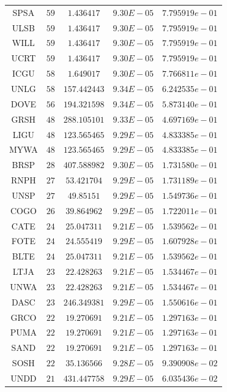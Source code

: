\documentclass{statsoc}
\begin{document}
\begin{table}
{\begin{tabular}{*{5}{c}}
SPSA  &  $59$  &  $1.436417$  &  $9.30E-05$  &  $7.795919e-01$\\
ULSB  &  $59$  &  $1.436417$  &  $9.30E-05$  &  $7.795919e-01$\\
WILL  &  $59$  &  $1.436417$  &  $9.30E-05$  &  $7.795919e-01$\\
UCRT  &  $59$  &  $1.436417$  &  $9.30E-05$  &  $7.795919e-01$\\
ICGU  &  $58$  &  $1.649017$  &  $9.30E-05$  &  $7.766811e-01$\\
UNLG  &  $58$  &  $157.442443$  &  $9.34E-05$  &  $6.242535e-01$\\
DOVE  &  $56$  &  $194.321598$  &  $9.34E-05$  &  $5.873140e-01$\\
GRSH  &  $48$  &  $288.105101$  &  $9.33E-05$  &  $4.697169e-01$\\
LIGU  &  $48$  &  $123.565465$  &  $9.29E-05$  &  $4.833385e-01$\\
MYWA  &  $48$  &  $123.565465$  &  $9.29E-05$  &  $4.833385e-01$\\
BRSP  &  $28$  &  $407.588982$  &  $9.30E-05$  &  $1.731580e-01$\\
RNPH  &  $27$  &  $53.421704$  &  $9.29E-05$  &  $1.731189e-01$\\
UNSP  &  $27$  &  $49.85151$  &  $9.29E-05$  &  $1.549736e-01$\\
COGO  &  $26$  &  $39.864962$  &  $9.29E-05$  &  $1.722011e-01$\\
CATE  &  $24$  &  $25.047311$  &  $9.21E-05$  &  $1.539562e-01$\\
FOTE  &  $24$  &  $24.555419$  &  $9.29E-05$  &  $1.607928e-01$\\
BLTE  &  $24$  &  $25.047311$  &  $9.21E-05$  &  $1.539562e-01$\\
LTJA  &  $23$  &  $22.428263$  &  $9.21E-05$  &  $1.534467e-01$\\
UNWA  &  $23$  &  $22.428263$  &  $9.21E-05$  &  $1.534467e-01$\\
DASC  &  $23$  &  $246.349381$  &  $9.29E-05$  &  $1.550616e-01$\\
GRCO  &  $22$  &  $19.270691$  &  $9.21E-05$  &  $1.297163e-01$\\
PUMA  &  $22$  &  $19.270691$  &  $9.21E-05$  &  $1.297163e-01$\\
SAND  &  $22$  &  $19.270691$  &  $9.21E-05$  &  $1.297163e-01$\\
SOSH  &  $22$  &  $35.136566$  &  $9.28E-05$  &  $9.390908e-02$\\
UNDD  &  $21$  &  $431.447758$  &  $9.29E-05$  &  $6.035436e-02$\\

\end{tabular}}
\end{table}
\end{document}
